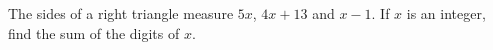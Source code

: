 The sides of a right triangle measure $5x$, $4x+13$ and $x-1$. If $x$ is an integer, find the sum of the digits of $x$.
